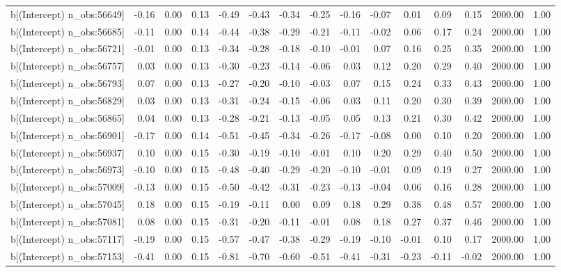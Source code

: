 \begin{table}[ht]
\begin{tabular}{rrrrrrrrrrrrrrr}
  b[(Intercept) n\_obs:56649] & -0.16 & 0.00 & 0.13 & -0.49 & -0.43 & -0.34 & -0.25 & -0.16 & -0.07 & 0.01 & 0.09 & 0.15 & 2000.00 & 1.00 \\ 
  b[(Intercept) n\_obs:56685] & -0.11 & 0.00 & 0.14 & -0.44 & -0.38 & -0.29 & -0.21 & -0.11 & -0.02 & 0.06 & 0.17 & 0.24 & 2000.00 & 1.00 \\ 
  b[(Intercept) n\_obs:56721] & -0.01 & 0.00 & 0.13 & -0.34 & -0.28 & -0.18 & -0.10 & -0.01 & 0.07 & 0.16 & 0.25 & 0.35 & 2000.00 & 1.00 \\ 
  b[(Intercept) n\_obs:56757] & 0.03 & 0.00 & 0.13 & -0.30 & -0.23 & -0.14 & -0.06 & 0.03 & 0.12 & 0.20 & 0.29 & 0.40 & 2000.00 & 1.00 \\ 
  b[(Intercept) n\_obs:56793] & 0.07 & 0.00 & 0.13 & -0.27 & -0.20 & -0.10 & -0.03 & 0.07 & 0.15 & 0.24 & 0.33 & 0.43 & 2000.00 & 1.00 \\ 
  b[(Intercept) n\_obs:56829] & 0.03 & 0.00 & 0.13 & -0.31 & -0.24 & -0.15 & -0.06 & 0.03 & 0.11 & 0.20 & 0.30 & 0.39 & 2000.00 & 1.00 \\ 
  b[(Intercept) n\_obs:56865] & 0.04 & 0.00 & 0.13 & -0.28 & -0.21 & -0.13 & -0.05 & 0.05 & 0.13 & 0.21 & 0.30 & 0.42 & 2000.00 & 1.00 \\ 
  b[(Intercept) n\_obs:56901] & -0.17 & 0.00 & 0.14 & -0.51 & -0.45 & -0.34 & -0.26 & -0.17 & -0.08 & 0.00 & 0.10 & 0.20 & 2000.00 & 1.00 \\ 
  b[(Intercept) n\_obs:56937] & 0.10 & 0.00 & 0.15 & -0.30 & -0.19 & -0.10 & -0.01 & 0.10 & 0.20 & 0.29 & 0.40 & 0.50 & 2000.00 & 1.00 \\ 
  b[(Intercept) n\_obs:56973] & -0.10 & 0.00 & 0.15 & -0.48 & -0.40 & -0.29 & -0.20 & -0.10 & -0.01 & 0.09 & 0.19 & 0.27 & 2000.00 & 1.00 \\ 
  b[(Intercept) n\_obs:57009] & -0.13 & 0.00 & 0.15 & -0.50 & -0.42 & -0.31 & -0.23 & -0.13 & -0.04 & 0.06 & 0.16 & 0.28 & 2000.00 & 1.00 \\ 
  b[(Intercept) n\_obs:57045] & 0.18 & 0.00 & 0.15 & -0.19 & -0.11 & 0.00 & 0.09 & 0.18 & 0.29 & 0.38 & 0.48 & 0.57 & 2000.00 & 1.00 \\ 
  b[(Intercept) n\_obs:57081] & 0.08 & 0.00 & 0.15 & -0.31 & -0.20 & -0.11 & -0.01 & 0.08 & 0.18 & 0.27 & 0.37 & 0.46 & 2000.00 & 1.00 \\ 
  b[(Intercept) n\_obs:57117] & -0.19 & 0.00 & 0.15 & -0.57 & -0.47 & -0.38 & -0.29 & -0.19 & -0.10 & -0.01 & 0.10 & 0.17 & 2000.00 & 1.00 \\ 
  b[(Intercept) n\_obs:57153] & -0.41 & 0.00 & 0.15 & -0.81 & -0.70 & -0.60 & -0.51 & -0.41 & -0.31 & -0.23 & -0.11 & -0.02 & 2000.00 & 1.00 \\ 

\end{tabular}
\end{table}
